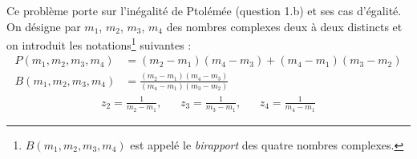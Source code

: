 Ce problème porte sur l'inégalité de Ptolémée (question 1.b) et ses cas d'égalité.\newline
On désigne par $m_1$, $m_2$, $m_3$, $m_4$ des nombres complexes deux à deux distincts et on introduit les notations\footnote{$B(m_1,m_2,m_3,m_4)$ est appelé le \emph{birapport} des quatre nombres complexes.} suivantes :
\begin{align*}
 P(m_1,m_2,m_3,m_4) &= (m_2-m_1)(m_4-m_3) + (m_4-m_1)(m_3-m_2) \\
 B(m_1,m_2,m_3,m_4) &= \frac{(m_2-m_1)(m_4-m_3)}{(m_4-m_1)(m_3-m_2)}
\end{align*}
\begin{align*}
 z_2 = \frac{1}{m_2-m_1}, & & z_3 = \frac{1}{m_3-m_1}, & & z_4 = \frac{1}{m_4-m_1}
\end{align*}
